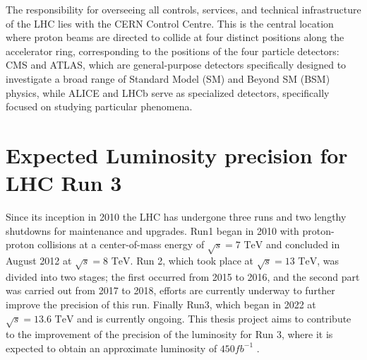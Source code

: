The responsibility for overseeing all controls, services, and technical infrastructure of the LHC lies with the CERN Control Centre. This is the central location where proton beams are directed to collide at four distinct positions along the accelerator ring, corresponding to the positions of the four particle detectors: CMS and ATLAS, which are general-purpose detectors specifically designed to investigate a broad range of Standard Model (SM) and Beyond SM (BSM) physics, while ALICE and LHCb serve as specialized detectors, specifically focused on studying particular phenomena.


\section{Expected  Luminosity precision for LHC Run 3}

Since its inception in 2010 the LHC has undergone three runs and two lengthy shutdowns for maintenance and upgrades. 
Run1 began in 2010 with proton-proton collisions at a center-of-mass energy of $\sqrt{s}=\text{7 TeV}$ and concluded in August 2012 at  $\sqrt{s}=\text{8 TeV}$. Run 2, which took place at $\sqrt{s}=\text{13 TeV}$, was divided into two stages; the first  occurred from 2015 to 2016, and the second part  was carried out   from 2017 to 2018, efforts are currently underway to further improve the precision of this run. Finally  Run3, which began in 2022 at $\sqrt{s}=\text{13.6 TeV}$ and is currently ongoing. This thesis project aims to contribute to the improvement of the precision of the luminosity for Run 3, where it is expected to obtain an approximate luminosity of $450 fb^{-1}$ \cite{
hl-lhc}. \\

